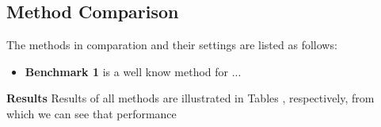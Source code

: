 
\subsection{Method Comparison}



The methods in comparation and their settings are listed as
follows:

\begin{itemize}
\item \textbf{Benchmark 1}
%
is a well know method for ...

\end{itemize}

\textbf{Results}
%
Results of all methods are illustrated in Tables \missref , respectively,
from which we can see that performance
